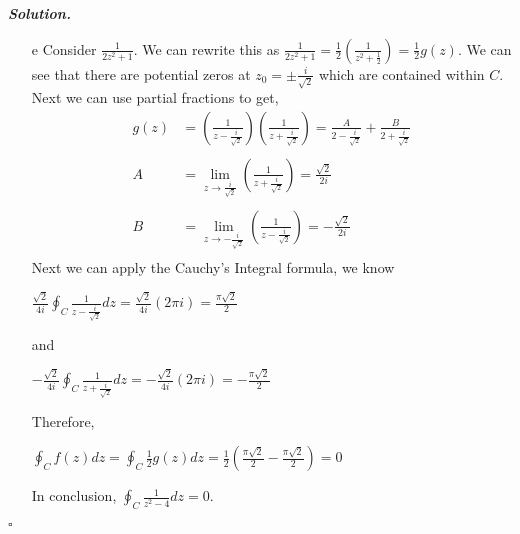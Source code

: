 \documentclass[12pt]{report}
\newenvironment{solution}[1][\it{Solution}]{\textbf{#1. } }{$\square$}
\begin{document}
\begin{solution}
\begin{enumerate}
        \item[e]
        Consider $\frac{1}{2z^2 +1}$. We can rewrite this as $\frac{1}{2z^2 +1} = \frac{1}{2}\left( \frac{1}{z^2 + \frac{1}{2}}\right) = \frac{1}{2}g(z)$. We can see that there are potential zeros at $z_0 = \pm \frac{i}{\sqrt{2}}$ which are contained within $C$. Next we can use partial fractions to get,
        \begin{align*}
            g(z) &= \left( \frac{1}{z - \frac{i}{\sqrt{2}}} \right) \left( \frac{1}{z + \frac{i}{\sqrt{2}}}\right) = \frac{A}{2 - \frac{i}{\sqrt{2}}} + \frac{B}{2 + \frac{i}{\sqrt{2}}}\\
            \\
            A &= \lim_{z \rightarrow \frac{i}{\sqrt{2}}} \left( \frac{1}{z + \frac{i}{\sqrt{2}}}\right) = \frac{\sqrt{2}}{2i}\\
            \\
            B &= \lim_{z \rightarrow -\frac{i}{\sqrt{2}}} \left( \frac{1}{z - \frac{i}{\sqrt{2}}}\right) = -\frac{\sqrt{2}}{2i}\\
        \end{align*}
        Next we can apply the Cauchy's Integral formula, we know
        \begin{center}
            $\frac{\sqrt{2}}{4i} \oint_{C} \frac{1}{z - \frac{i}{\sqrt{2}}} dz = \frac{\sqrt{2}}{4i} (2\pi i) = \frac{\pi \sqrt{2}}{2}$
        \end{center}
        and
        \begin{center}
            $-\frac{\sqrt{2}}{4i} \oint_{C} \frac{1}{z + \frac{i}{\sqrt{2}}} dz = -\frac{\sqrt{2}}{4i} (2\pi i) = -\frac{\pi \sqrt{2}}{2}$
        \end{center}
        Therefore,
        \begin{center}
            $\oint_C f(z) dz = \oint_C \frac{1}{2}g(z) dz = \frac{1}{2} \left(\frac{\pi \sqrt{2}}{2} -\frac{\pi \sqrt{2}}{2}\right) = 0$
        \end{center}
        In conclusion, $\boxed{\oint_C \frac{1}{z^2 - 4} dz} = 0$.


\end{enumerate}
\end{solution}
\end{document}
